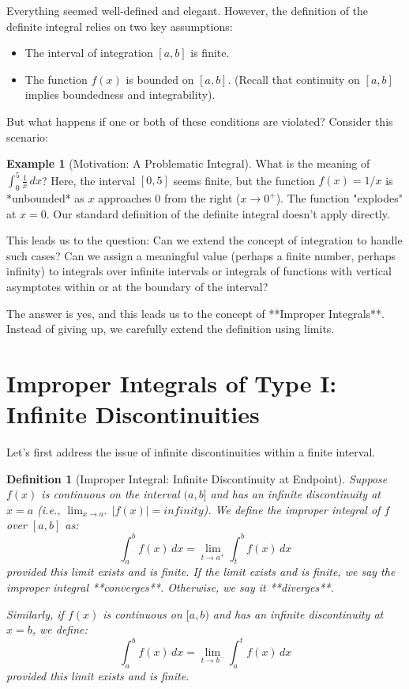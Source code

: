 \documentclass[11pt]{article}
\def\infty{infinity}%
\newtheorem{definition}[theorem]{Definition}
\theoremstyle{definition}
\newtheorem{example}[theorem]{Example}
\newcommand{\dx}{\, dx} %
\begin{document}
Everything seemed well-defined and elegant. However, the definition of the definite integral relies on two key assumptions:
\begin{itemize}
    \item The interval of integration $[a, b]$ is finite.
    \item The function $f(x)$ is bounded on $[a, b]$. (Recall that continuity on $[a, b]$ implies boundedness and integrability).
\end{itemize}

But what happens if one or both of these conditions are violated? Consider this scenario:

\begin{example}[Motivation: A Problematic Integral]
    What is the meaning of $\int_0^5 \frac{1}{x} \dx$?
    Here, the interval $[0, 5]$ seems finite, but the function $f(x) = 1/x$ is *unbounded* as $x$ approaches 0 from the right ($x \to 0^+$). The function "explodes" at $x=0$. Our standard definition of the definite integral doesn't apply directly.
\end{example}

This leads us to the question: Can we extend the concept of integration to handle such cases? Can we assign a meaningful value (perhaps a finite number, perhaps infinity) to integrals over infinite intervals or integrals of functions with vertical asymptotes within or at the boundary of the interval?

The answer is yes, and this leads us to the concept of **Improper Integrals**. Instead of giving up, we carefully extend the definition using limits.

\section{Improper Integrals of Type I: Infinite Discontinuities}

Let's first address the issue of infinite discontinuities within a finite interval.

\begin{definition}[Improper Integral: Infinite Discontinuity at Endpoint]
    Suppose $f(x)$ is continuous on the interval $(a, b]$ and has an infinite discontinuity at $x=a$ (i.e., $\lim_{x \to a^+} |f(x)| = \infty$). We define the improper integral of $f$ over $[a, b]$ as:
    \[
    \int_a^b f(x) \dx = \lim_{t \to a^+} \int_t^b f(x) \dx
    \]
    provided this limit exists and is finite. If the limit exists and is finite, we say the improper integral **converges**. Otherwise, we say it **diverges**.

    Similarly, if $f(x)$ is continuous on $[a, b)$ and has an infinite discontinuity at $x=b$, we define:
    \[
    \int_a^b f(x) \dx = \lim_{t \to b^-} \int_a^t f(x) \dx
    \]
    provided this limit exists and is finite.
\end{definition}
\end{document}

